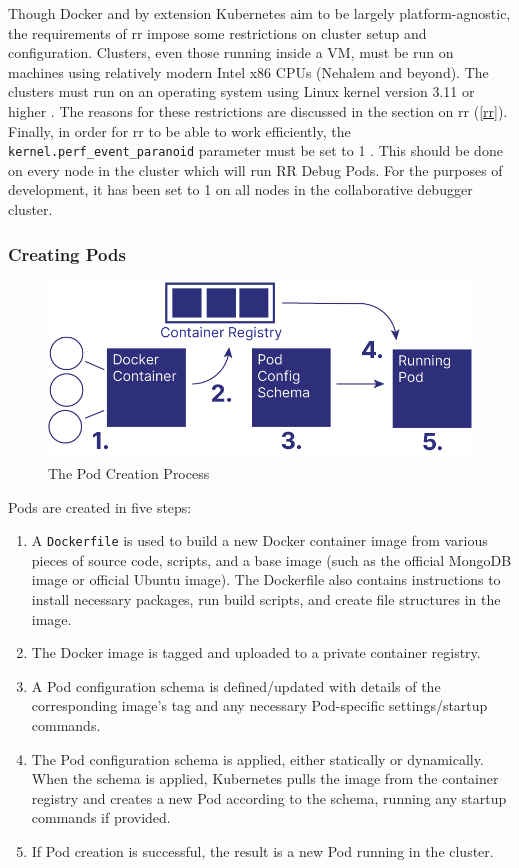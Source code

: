 \documentclass[12pt]{article}
\begin{document}
Though Docker and by extension Kubernetes aim to be largely
platform-agnostic, the requirements of rr impose some restrictions on
cluster setup and configuration.  Clusters, even those running inside
a VM, must be run on machines using relatively modern Intel x86 CPUs
(Nehalem and beyond).  The clusters must run on an operating system
using Linux kernel version 3.11 or higher \cite{rr-repo}.  The reasons
for these restrictions are discussed in the section on rr (\ref{rr}).
Finally, in order for rr to be able to work efficiently, the
\lstinline{kernel.perf_event_paranoid} parameter must be set to 1
\cite{rr-repo}.  This should be done on every node in the cluster
which will run RR Debug Pods.  For the purposes of development, it has
been set to 1 on all nodes in the collaborative debugger cluster.

\subsubsection{Creating Pods}

\begin{figure}[h!]

  \includegraphics[scale=.9]{pod_creation}
  \centering
  \caption{The Pod Creation Process}
  \label{podcreation:overview}
\end{figure}

Pods are created in five steps:

\begin{enumerate}
\item A \lstinline{Dockerfile} is used to build a new Docker container
  image from various pieces of source code, scripts, and a base image
  (such as the official MongoDB image or official Ubuntu image).  The
  Dockerfile also contains instructions to install necessary packages,
  run build scripts, and create file structures in the image.
\item The Docker image is tagged and uploaded to a private container
  registry.
\item A Pod configuration schema is defined/updated with details of
  the corresponding image's tag and any necessary Pod-specific
  settings/startup commands.
\item The Pod configuration schema is applied, either statically or
  dynamically.  When the schema is applied, Kubernetes pulls the image
  from the container registry and creates a new Pod according to the
  schema, running any startup commands if provided.
\item If Pod creation is successful, the result is a new Pod running
  in the cluster.
\end{enumerate}
\end{document}
